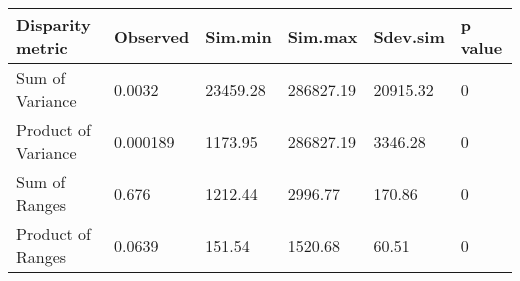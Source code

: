 
\begin{tabular}[t]{l l l l l l }		%
\hline
\textbf{Disparity metric} & \textbf{Observed} & \textbf{Sim.min} & \textbf{Sim.max} & \textbf{Sdev.sim} & \textbf{p value} \\
\hline
Sum of Variance & 0.0032 & 23459.28 & 286827.19 & 20915.32 &	0\\
Product of Variance	& 0.000189 & 1173.95 &	286827.19 &	3346.28 & 0\\
Sum of Ranges &	0.676 &	1212.44 &	2996.77 &	170.86 & 0 \\
Product of Ranges & 0.0639 & 151.54 & 1520.68 &	60.51 &	0\\
\hline
\end{tabular}